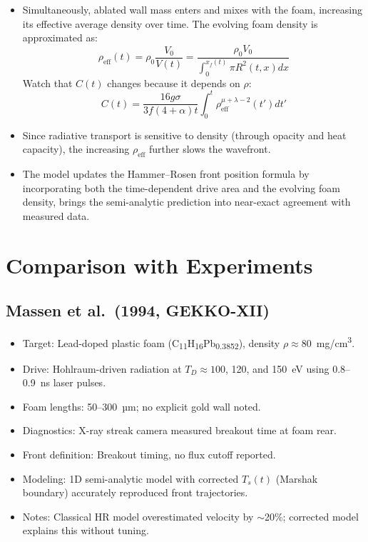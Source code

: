\documentclass{article}
\begin{document}
\begin{itemize}
    This leads to a further reduction in $T_s(t)$, since less energy reaches the foam.

    \item Simultaneously, ablated wall mass enters and mixes with the foam, increasing its effective average density over time. The evolving foam density is approximated as:
    \begin{equation}
        \rho_{\text{eff}}(t) = \rho _0 \frac{V_0}{V(t)} = \frac{\rho_0 V_0}{\int_{0}^{x_f(t)} \pi R^2(t,x) dx}
    \end{equation}    Watch that $C(t)$ changes because it depends on $\rho$: 
    \begin{equation}
    C(t) = \frac{16g\sigma}{3f(4+\alpha) t}\int_{0}^{t}\rho_{\text{eff}}^{\mu+\lambda-2}(t')dt'
    \end{equation}

    \item Since radiative transport is sensitive to density (through opacity and heat capacity), the increasing $\rho_{\text{eff}}$ further slows the wavefront.

    \item The model updates the Hammer–Rosen front position formula by incorporating both the time-dependent drive area and the evolving foam density, brings the semi-analytic prediction into near-exact agreement with measured data.

\end{itemize}

\section{Comparison with Experiments}

\subsection*{Massen et al.\ (1994, GEKKO-XII)}

\begin{itemize}
    \item Target: Lead-doped plastic foam (C\textsubscript{11}H\textsubscript{16}Pb\textsubscript{0.3852}), density $\rho \approx 80$~mg/cm\textsuperscript{3}.
    \item Drive: Hohlraum-driven radiation at $T_D \approx 100$, 120, and 150~eV using 0.8--0.9~ns laser pulses.
    \item Foam lengths: 50--300~µm; no explicit gold wall noted.
    \item Diagnostics: X-ray streak camera measured breakout time at foam rear.
    \item Front definition: Breakout timing, no flux cutoff reported.
    \item Modeling: 1D semi-analytic model with corrected $T_s(t)$ (Marshak boundary) accurately reproduced front trajectories.
    \item Notes: Classical HR model overestimated velocity by $\sim$20\%; corrected model explains this without tuning.
\end{itemize}
\end{document}
